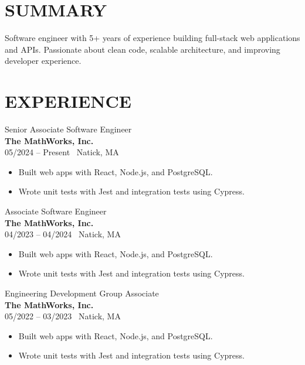 \documentclass[11pt]{article}
\begin{document}
\begin{minipage}[t]{0.65\textwidth}
    \section*{SUMMARY}
    Software engineer with 5+ years of experience building full-stack web applications and APIs. Passionate about clean code, scalable architecture, and improving developer experience.\\

    \section*{EXPERIENCE}
    {\Large Senior Associate Software Engineer} \\
    \textbf{The MathWorks, Inc.} \\
    05/2024 -- Present \textbar\ Natick, MA
    \begin{itemize}[leftmargin=*]
        \item Built web apps with React, Node.js, and PostgreSQL.
        \item Wrote unit tests with Jest and integration tests using Cypress.\\
    \end{itemize}

    {\Large Associate Software Engineer} \\
    \textbf{The MathWorks, Inc.} \\
    04/2023 -- 04/2024 \textbar\ Natick, MA
    \begin{itemize}[leftmargin=*]
        \item Built web apps with React, Node.js, and PostgreSQL.
        \item Wrote unit tests with Jest and integration tests using Cypress.\\
    \end{itemize}

    {\Large Engineering Development Group Associate} \\
    \textbf{The MathWorks, Inc.} \\
    05/2022 -- 03/2023 \textbar\ Natick, MA
    \begin{itemize}[leftmargin=*]
        \item Built web apps with React, Node.js, and PostgreSQL.
        \item Wrote unit tests with Jest and integration tests using Cypress.
    \end{itemize}
    

\end{minipage}
\end{document}
